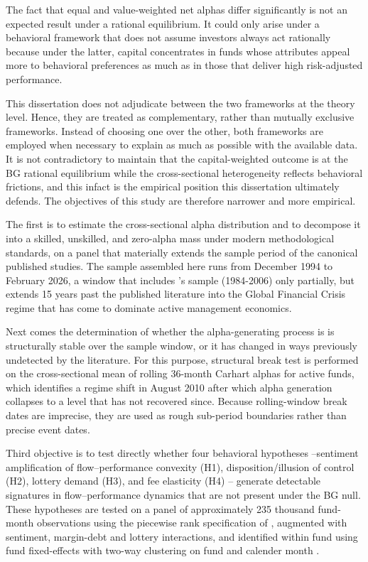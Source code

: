\documentclass[12pt, oneside]{report}
\begin{document}
The fact that equal and value-weighted net alphas differ significantly is not an expected result under a rational equilibrium. It could only arise under a behavioral framework that does not assume investors always act rationally because under the latter, capital concentrates in funds whose attributes appeal more to behavioral preferences as much as in those that deliver high risk-adjusted performance.

This dissertation does not adjudicate between the two frameworks at the
theory level. Hence, they are treated as complementary, rather than mutually exclusive frameworks. Instead of choosing one over the other, both frameworks are employed when necessary to explain as much as possible with the available data. It is not contradictory to maintain that the capital-weighted outcome is at the BG rational equilibrium while the cross-sectional heterogeneity reflects behavioral frictions, and this infact is the empirical position this dissertation ultimately defends. The objectives of this study are therefore narrower and more empirical.

The first is to estimate the cross-sectional alpha distribution and to decompose it into a skilled, unskilled, and zero-alpha mass under modern
methodological standards, on a panel that materially extends the sample
period of the canonical published studies. The sample assembled here runs from December 1994 to February 2026, a window that includes \textcite{FamaFrench2010}'s sample (1984-2006) only partially, but extends 15 years past the published literature into the Global Financial Crisis regime that has come to dominate active management economics.

Next comes the determination of whether the alpha-generating process is 
is structurally stable over the sample window, or it has changed in ways previously undetected by the literature. For this purpose,
\textcite{Bai1998,Bai2003} structural break test is performed on the cross-sectional mean of rolling 36-month Carhart alphas for active funds, which identifies a regime shift in August 2010 after which alpha generation collapses to a level that has not recovered since. Because rolling-window break dates are imprecise, they are used as rough sub-period boundaries rather than precise event dates.

Third objective is to test directly whether four behavioral hypotheses --sentiment amplification of flow--performance convexity (H1), disposition/illusion of control (H2), lottery demand (H3), and fee elasticity (H4) -- generate detectable signatures in flow--performance dynamics that are not present under the BG null. These hypotheses are tested on a panel of approximately 235 thousand fund-month observations using the piecewise rank specification of \textcite{SirriTufano1998}, augmented with sentiment, margin-debt and lottery interactions, and identified within fund using fund fixed-effects with two-way clustering on fund and calender month \parencite{Petersen2009}.
\end{document}
